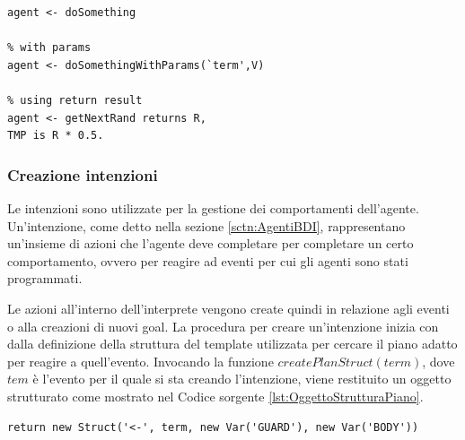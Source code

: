 \medskip
\begin{lstlisting}[firstnumber=1,label={lst:UtilizzoBindingIntuProlog},caption={Utilizzo riferimenti oggetti Java in tuProlog}]
% no params
agent <- doSomething

% with params
agent <- doSomethingWithParams(`term',V)

% using return result
agent <- getNextRand returns R,
TMP is R * 0.5.
\end{lstlisting}

\subsubsection{Creazione intenzioni}
Le intenzioni sono utilizzate per la gestione dei comportamenti dell'agente. Un'intenzione, come detto nella sezione \ref{sctn:AgentiBDI}, rappresentano un'insieme di azioni che l'agente deve completare per completare un certo comportamento, ovvero per reagire ad eventi per cui gli agenti sono stati programmati.

Le azioni all'interno dell'interprete vengono create quindi in relazione agli eventi o alla creazioni di nuovi goal.
La procedura per creare un'intenzione inizia con dalla definizione della struttura del template utilizzata per cercare il piano adatto per reagire a quell'evento. Invocando la funzione $createPlanStruct(term)$, dove $tem$ è l'evento per il quale si sta creando l'intenzione, viene restituito un oggetto strutturato come mostrato nel Codice sorgente \ref{lst:OggettoStrutturaPiano}.
\medskip
\begin{lstlisting}[firstnumber=1,label={lst:OggettoStrutturaPiano},caption={Oggetto che definisce la struttura del piano}]
return new Struct('<-', term, new Var('GUARD'), new Var('BODY'))
\end{lstlisting}

